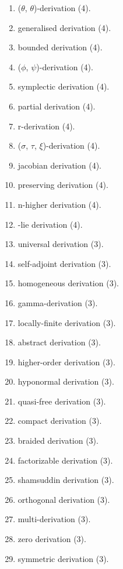 \begin{enumerate}
\item \allowbreak ($\theta$, $\theta$)-derivation \hfill(4).
\item \allowbreak generalised derivation \hfill(4).
\item \allowbreak bounded derivation \hfill(4).
\item \allowbreak ($\phi$, $\psi$)-derivation \hfill(4).
\item \allowbreak symplectic derivation \hfill(4).
\item \allowbreak partial derivation \hfill(4).
\item \allowbreak r-derivation \hfill(4).
\item \allowbreak ($\sigma$, $\tau$, $\xi$)-derivation \hfill(4).
\item \allowbreak jacobian derivation \hfill(4).
\item \allowbreak preserving derivation \hfill(4).
\item \allowbreak n-higher derivation \hfill(4).
\item \allowbreak *-lie derivation \hfill(4).
\item \allowbreak universal derivation \hfill(3).
\item \allowbreak self-adjoint derivation \hfill(3).
\item \allowbreak homogeneous derivation \hfill(3).
\item \allowbreak gamma-derivation \hfill(3).
\item \allowbreak locally-finite derivation \hfill(3).
\item \allowbreak abstract derivation \hfill(3).
\item \allowbreak higher-order derivation \hfill(3).
\item \allowbreak hyponormal derivation \hfill(3).
\item \allowbreak quasi-free derivation \hfill(3).
\item \allowbreak compact derivation \hfill(3).
\item \allowbreak braided derivation \hfill(3).
\item \allowbreak factorizable derivation \hfill(3).
\item \allowbreak shamsuddin derivation \hfill(3).
\item \allowbreak orthogonal derivation \hfill(3).
\item \allowbreak multi-derivation \hfill(3).
\item \allowbreak zero derivation \hfill(3).
\item \allowbreak symmetric derivation \hfill(3).

\end{enumerate}
